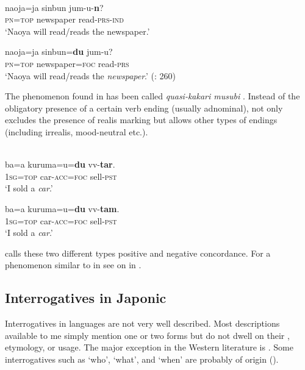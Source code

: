 \newpage 
\ea%
    \label{ex:japa:52}
    \\
    \ea
    \gll naoja=ja sinbun jum-u-\textbf{{n}}?\\
    \textsc{pn}=\textsc{top}  newspaper    read-\textsc{prs}-\textsc{ind}\\
    \glt ‘Naoya will read/reads the newspaper.’
    
    \ex
    \gll naoja=ja sinbun=\textbf{{du}} jum-{u?}\\
    \textsc{pn}=\textsc{top}  newspaper=\textsc{foc}  read-\textsc{prs}\\
    \glt ‘Naoya will read/reads the \textit{newspaper}.’ (\citealt{Davis2015}: 260)
    \z
    \z

The phenomenon found in  has been called \textit{quasi-kakari musubi} \citep{Shimoji2011b}. Instead of the obligatory presence of a certain verb ending (usually adnominal),  not only excludes the presence of realis marking but allows other types of endings (including irrealis, mood-neutral etc.).

\ea%
    \label{ex:japa:53}
    \\
    \ea
    \gll ba=a    kuruma=u=\textbf{{du}} vv-\textbf{{tar}}.\\
    1\textsc{sg}=\textsc{top}  car-\textsc{acc}=\textsc{foc}    sell-\textsc{pst}\\
    \glt ‘I sold a \textit{car}.’
    
    \ex
    \gll *ba=a    kuruma=u=\textbf{{du}} vv-\textbf{{tam}}.\\
    1\textsc{sg}=\textsc{top}  car-\textsc{acc}=\textsc{foc}    sell-\textsc{pst}\\
    \glt ‘I sold a \textit{car}.’ \citep[120]{Shimoji2011b}
    \z
    \z

\citet[121]{Shimoji2011b} calls these two different types positive and negative concordance. For a phenomenon similar to \textit{} in  see  on  in .

\subsection{Interrogatives in Japonic}\label{sec:5.6.3}

Interrogatives in  languages are not very well described. Most descriptions available to me simply mention one or two forms but do not dwell on their , etymology, or usage. The major exception in the Western literature is \citet[297--336]{Vovin2005}. Some interrogatives such as ‘who’, ‘what’, and ‘when’ are probably of  origin ().

